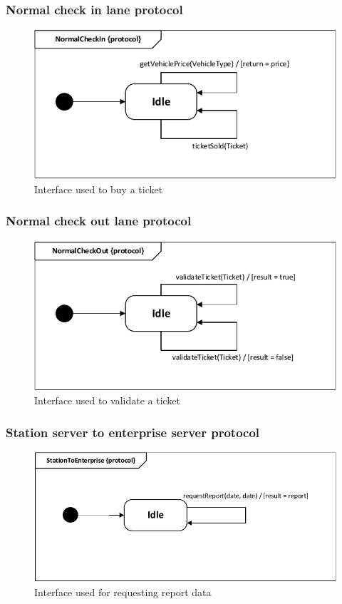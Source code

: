 \subsubsection*{Normal check in lane protocol}
\begin{figure}[H]
\centering
\includegraphics[width=0.7\linewidth]{img/behaviour_state_machines/protocol_state_machines/protocol_state_machine_station_server_to_normal_lane_check_in}
\caption{Interface used to buy a ticket}
\label{fig:protocol_state_machine_station_server_to_normal_lane_check_in}
\end{figure}

\subsubsection*{Normal check out lane protocol}
\begin{figure}[H]
\centering
\includegraphics[width=0.7\linewidth]{img/behaviour_state_machines/protocol_state_machines/protocol_state_machine_station_server_to_normal_lane_check_out}
\caption{Interface used to validate a ticket}
\label{fig:protocol_state_machine_station_server_to_normal_lane_check_out}
\end{figure}

\subsubsection*{Station server to enterprise server protocol}
\begin{figure}[H]
\centering
\includegraphics[width=0.7\linewidth]{img/behaviour_state_machines/protocol_state_machines/protocol_state_machine_station_server_to_enterprise_server}
\caption{Interface used for requesting report data}
\label{fig:protocol_state_machine_station_server_to_enterprise_server}
\end{figure}

